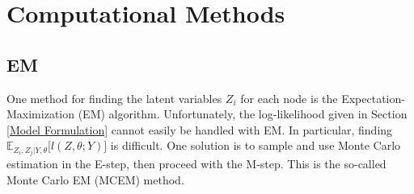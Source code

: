 \documentclass{article}
\begin{document}


\section{Computational Methods} \label{Computational Methods}

\subsection{EM}

One method for finding the latent variables $Z_i$ for each node is the Expectation-Maximization (EM) algorithm. Unfortunately, the log-likelihood given in Section \ref{Model Formulation} cannot easily be handled with EM. In particular, finding $\mathbb{E}_{Z_i, Z_j | Y, \theta}\Big[l(Z, \theta ; Y)\Big]$ is difficult. One solution is to sample and use Monte Carlo estimation in the E-step, then proceed with the M-step. This is the so-called Monte Carlo EM (MCEM) method.
\end{document}
